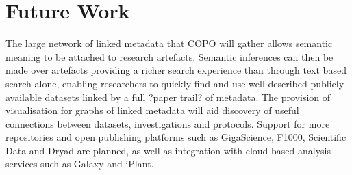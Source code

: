 \documentclass[runningheads,a4paper]{llncs}
\begin{document}
\vspace*{-0.1in}
\section{Future Work}
\vspace*{-0.1in}
The large network of linked metadata that COPO will gather allows
semantic meaning to be attached to research artefacts. Semantic
inferences can then be made over artefacts providing a richer search
experience than through text based search alone, enabling researchers
to quickly find and use well-described publicly available datasets
linked by a full ?paper trail? of metadata. The provision of
visualisation for graphs of linked metadata will aid discovery of
useful connections between datasets, investigations and
protocols. Support for more repositories and open publishing platforms
such as GigaScience, F1000, Scientific Data and Dryad are planned, as
well as integration with cloud-based analysis services such as Galaxy
and iPlant.
\end{document}
